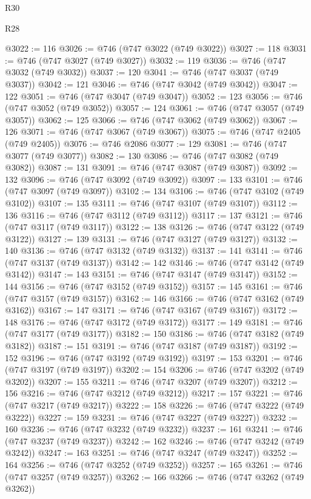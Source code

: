\begin{lexlean}{R30}
\begin{lexlean}{R28}
\begin{coremodule}
{{{{{{{{{{{{{{{{{{{{{{{{{{{{{{{{{{{{{{{{{{{{{{{{{{{{{{{{{{{{{{{{{{{{{{{{{{{{{{{{{{{{{{{{{{{{{{{{{{{{{{{{{{{{{{{{{{{{{{{{{{{{{{{{{{{{{{{{{{{{{{{@3022 := 116
@3026 := @746 (@747 @3022 (@749 @3022))
@3027 := 118
@3031 := @746 (@747 @3027 (@749 @3027))
@3032 := 119
@3036 := @746 (@747 @3032 (@749 @3032))
@3037 := 120
@3041 := @746 (@747 @3037 (@749 @3037))
@3042 := 121
@3046 := @746 (@747 @3042 (@749 @3042))
@3047 := 122
@3051 := @746 (@747 @3047 (@749 @3047))
@3052 := 123
@3056 := @746 (@747 @3052 (@749 @3052))
@3057 := 124
@3061 := @746 (@747 @3057 (@749 @3057))
@3062 := 125
@3066 := @746 (@747 @3062 (@749 @3062))
@3067 := 126
@3071 := @746 (@747 @3067 (@749 @3067))
@3075 := @746 (@747 @2405 (@749 @2405))
@3076 := @746 @2086
@3077 := 129
@3081 := @746 (@747 @3077 (@749 @3077))
@3082 := 130
@3086 := @746 (@747 @3082 (@749 @3082))
@3087 := 131
@3091 := @746 (@747 @3087 (@749 @3087))
@3092 := 132
@3096 := @746 (@747 @3092 (@749 @3092))
@3097 := 133
@3101 := @746 (@747 @3097 (@749 @3097))
@3102 := 134
@3106 := @746 (@747 @3102 (@749 @3102))
@3107 := 135
@3111 := @746 (@747 @3107 (@749 @3107))
@3112 := 136
@3116 := @746 (@747 @3112 (@749 @3112))
@3117 := 137
@3121 := @746 (@747 @3117 (@749 @3117))
@3122 := 138
@3126 := @746 (@747 @3122 (@749 @3122))
@3127 := 139
@3131 := @746 (@747 @3127 (@749 @3127))
@3132 := 140
@3136 := @746 (@747 @3132 (@749 @3132))
@3137 := 141
@3141 := @746 (@747 @3137 (@749 @3137))
@3142 := 142
@3146 := @746 (@747 @3142 (@749 @3142))
@3147 := 143
@3151 := @746 (@747 @3147 (@749 @3147))
@3152 := 144
@3156 := @746 (@747 @3152 (@749 @3152))
@3157 := 145
@3161 := @746 (@747 @3157 (@749 @3157))
@3162 := 146
@3166 := @746 (@747 @3162 (@749 @3162))
@3167 := 147
@3171 := @746 (@747 @3167 (@749 @3167))
@3172 := 148
@3176 := @746 (@747 @3172 (@749 @3172))
@3177 := 149
@3181 := @746 (@747 @3177 (@749 @3177))
@3182 := 150
@3186 := @746 (@747 @3182 (@749 @3182))
@3187 := 151
@3191 := @746 (@747 @3187 (@749 @3187))
@3192 := 152
@3196 := @746 (@747 @3192 (@749 @3192))
@3197 := 153
@3201 := @746 (@747 @3197 (@749 @3197))
@3202 := 154
@3206 := @746 (@747 @3202 (@749 @3202))
@3207 := 155
@3211 := @746 (@747 @3207 (@749 @3207))
@3212 := 156
@3216 := @746 (@747 @3212 (@749 @3212))
@3217 := 157
@3221 := @746 (@747 @3217 (@749 @3217))
@3222 := 158
@3226 := @746 (@747 @3222 (@749 @3222))
@3227 := 159
@3231 := @746 (@747 @3227 (@749 @3227))
@3232 := 160
@3236 := @746 (@747 @3232 (@749 @3232))
@3237 := 161
@3241 := @746 (@747 @3237 (@749 @3237))
@3242 := 162
@3246 := @746 (@747 @3242 (@749 @3242))
@3247 := 163
@3251 := @746 (@747 @3247 (@749 @3247))
@3252 := 164
@3256 := @746 (@747 @3252 (@749 @3252))
@3257 := 165
@3261 := @746 (@747 @3257 (@749 @3257))
@3262 := 166
@3266 := @746 (@747 @3262 (@749 @3262))
}}}}}}}}}}}}}}}}}}}}}}}}}}}}}}}}}}}}}}}}}}}}}}}}}}}}}}}}}}}}}}}}}}}}}}}}}}}}}}}}}}}}}}}}}}}}}}}}}}}}}}}}}}}}}}}}}}}}}}}}}}}}}}}}}}}}}}}}}}}}}}}
\end{coremodule}
\end{lexlean}
\end{lexlean}
